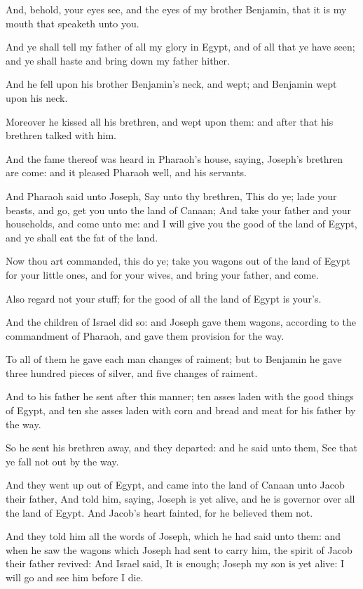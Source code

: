 \Verse And, behold, your eyes see, and the eyes of my brother Benjamin, that it is my mouth that speaketh unto you.

\Verse And ye shall tell my father of all my glory in Egypt, and of all that ye have seen; and ye shall haste and bring down my father hither.

\Verse And he fell upon his brother Benjamin's neck, and wept; and Benjamin wept upon his neck.

\Verse Moreover he kissed all his brethren, and wept upon them: and after that his brethren talked with him.

\Verse And the fame thereof was heard in Pharaoh's house, saying, Joseph's brethren are come: and it pleased Pharaoh well, and his servants.

\Verse And Pharaoh said unto Joseph, Say unto thy brethren, This do ye; lade your beasts, and go, get you unto the land of Canaan; \Verse And take your father and your households, and come unto me: and I will give you the good of the land of Egypt, and ye shall eat the fat of the land.

\Verse Now thou art commanded, this do ye; take you wagons out of the land of Egypt for your little ones, and for your wives, and bring your father, and come.

\Verse Also regard not your stuff; for the good of all the land of Egypt is your's.

\Verse And the children of Israel did so: and Joseph gave them wagons, according to the commandment of Pharaoh, and gave them provision for the way.

\Verse To all of them he gave each man changes of raiment; but to Benjamin he gave three hundred pieces of silver, and five changes of raiment.

\Verse And to his father he sent after this manner; ten asses laden with the good things of Egypt, and ten she asses laden with corn and bread and meat for his father by the way.

\Verse So he sent his brethren away, and they departed: and he said unto them, See that ye fall not out by the way.

\Verse And they went up out of Egypt, and came into the land of Canaan unto Jacob their father, \Verse And told him, saying, Joseph is yet alive, and he is governor over all the land of Egypt. And Jacob's heart fainted, for he believed them not.

\Verse And they told him all the words of Joseph, which he had said unto them: and when he saw the wagons which Joseph had sent to carry him, the spirit of Jacob their father revived: \Verse And Israel said, It is enough; Joseph my son is yet alive: I will go and see him before I die.

